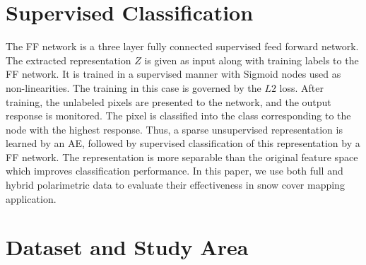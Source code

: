 \section{Supervised Classification}
The FF network is a three layer fully connected supervised feed forward network. The extracted representation $Z$ is given as input along with training labels to the FF network. It is trained in a supervised manner with Sigmoid nodes used as non-linearities. The training in this case is governed by the $L2$ loss. After training, the unlabeled pixels are presented to the network, and the output response is monitored. The pixel is classified into the class corresponding to the node with the highest response. 
%
Thus, a sparse unsupervised representation is learned by an AE, followed by supervised classification of this representation by a FF network. The representation is more separable than the original feature space which improves classification performance. In this paper, we use both full and hybrid polarimetric data to evaluate their effectiveness in snow cover mapping application.

\section{Dataset and Study Area}

